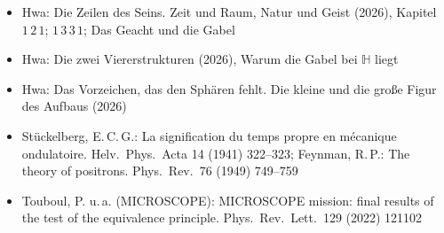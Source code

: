 \documentclass[11pt,a4paper]{article}
\newcommand{\HH}{\mathbb H}
\begin{document}
\begin{itemize}[leftmargin=1.2em,itemsep=0pt]
\item Hwa: Die Zeilen des Seins. Zeit und Raum, Natur und Geist (2026), Kapitel $1\,2\,1$; $1\,3\,3\,1$; Das Geacht und die Gabel
\item Hwa: Die zwei Viererstrukturen (2026), Warum die Gabel bei $\HH$ liegt
\item Hwa: Das Vorzeichen, das den Sphären fehlt. Die kleine und die große Figur des Aufbaus (2026)
\item Stückelberg, E.\,C.\,G.: La signification du temps propre en mécanique ondulatoire. Helv.\ Phys.\ Acta 14 (1941) 322--323; Feynman, R.\,P.: The theory of positrons. Phys.\ Rev.\ 76 (1949) 749--759
\item Touboul, P. u.\,a. (MICROSCOPE): MICROSCOPE mission: final results of the test of the equivalence principle. Phys.\ Rev.\ Lett.\ 129 (2022) 121102
\end{itemize}

\vfill
\sloppy
\end{document}
